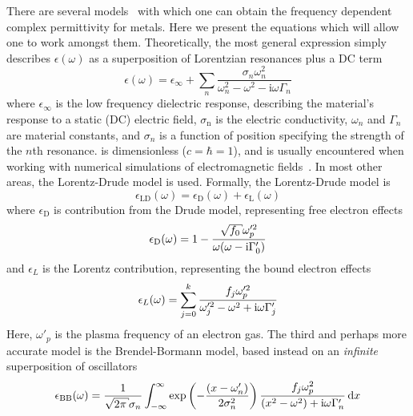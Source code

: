 There are several models~\cite{rakic1998optical} with which one
can obtain the frequency dependent complex permittivity for metals.  Here
we present the equations which will allow one to work amongst them.
Theoretically, the most general expression simply describes
$\epsilon(\omega)$ as a superposition of Lorentzian resonances plus a DC
term
\begin{equation}
\epsilon(\omega)= \epsilon_\infty+\sum_n \frac{\sigma_n \omega_n^2} {\omega_n^2-\omega^2-{\mathrm{i}}\omega\Gamma_n}
\label{eqn:meepdispersion}
\end{equation}
where $\epsilon_\infty$ is the low frequency dielectric response,
describing the material's response to a static (DC) electric field,
$\sigma_\mathrm{n}$ is the electric conductivity, $\omega_n$ and $\Gamma_n$ are
material constants, and $\sigma_n$ is a function of position specifying the
strength of the $n$th resonance.   is
dimensionless ($c=\hbar=1$), and is usually encountered when working with
numerical simulations of electromagnetic fields~\cite{oskooi2010meep}.
In most other areas, the Lorentz-Drude model is used.  Formally, the
Lorentz-Drude model is
\begin{equation}
\epsilon_\mathrm{LD}(\omega)=\epsilon_\mathrm{D}(\omega)+\epsilon_\mathrm{L}(\omega)
\end{equation}
where $\epsilon_\mathrm{D}$ is contribution from the Drude model, representing
free electron effects
\begin{align}
\epsilon_\mathrm{D}(\omega)=1-\frac{\sqrt{f_0} \omega_p^{\prime 2}}{\omega(\omega -
\mi\Gamma_0^\prime)}
\label{eqn:drude}
\end{align}
and $\epsilon_L$ is the Lorentz contribution, representing the bound
electron effects
\begin{align}
\epsilon_L(\omega) =\sum_{j=0}^{k}\frac{f_j\omega_p^{\prime 2}}{\omega_j^{\prime
2}-\omega^2+{\mathrm{i}}\omega\Gamma_j^\prime}
\label{eqn:lorentzdrude}
\end{align}
Here, $\omega'_p$ is the plasma frequency of an electron gas.
The third and perhaps more accurate model is the Brendel-Bormann model, based instead on an
\textit{infinite} superposition of oscillators
\begin{align}
\epsilon_\text{BB}(\omega) = \frac{1}{\sqrt{2 \pi} \sigma_n} \intinfty
\exp\left(-\frac{(x-\omega'_n)}{2 \sigma_n^2}\right)
\frac{f_j \omega_p^2}{(x^2-\omega^2)+\mi \omega \Gamma'_n} \md x
\label{eqn:brendelbormann}
\end{align}


